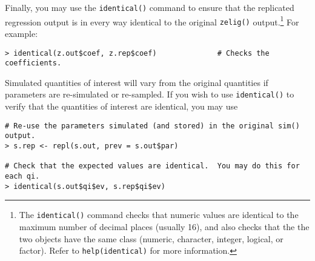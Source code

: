 Finally, you may use the {\tt identical()} command to ensure that the
replicated regression output is in every way identical to the original
{\tt zelig()} output.\footnote{The {\tt identical()} command checks
  that numeric values are identical to the maximum number of decimal
  places (usually 16), and also checks that the the two objects have
  the same class (numeric, character, integer, logical, or factor).
  Refer to {\tt help(identical)} for more information.}  For example:
\begin{verbatim}
> identical(z.out$coef, z.rep$coef)              # Checks the coefficients.
\end{verbatim}
Simulated quantities of interest will vary from the original
quantities if parameters are re-simulated or re-sampled.  If you wish to
use {\tt identical()} to verify that the quantities of interest are
identical, you may use
\begin{verbatim}
# Re-use the parameters simulated (and stored) in the original sim() output.
> s.rep <- repl(s.out, prev = s.out$par) 

# Check that the expected values are identical.  You may do this for each qi.
> identical(s.out$qi$ev, s.rep$qi$ev) 
\end{verbatim}



